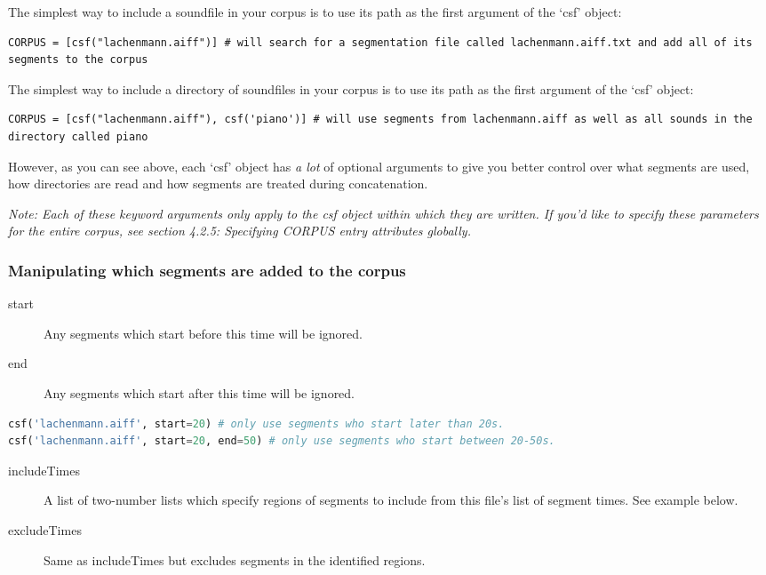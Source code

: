 \documentclass{article}
\begin{document}
\begin{spacing}{1.2}
The simplest way to include a soundfile in your corpus is to use its path as the first argument of the `csf' object:
\begin{lstlisting}
CORPUS = [csf("lachenmann.aiff")] # will search for a segmentation file called lachenmann.aiff.txt and add all of its segments to the corpus
\end{lstlisting}

The simplest way to include a directory of soundfiles in your corpus is to use its path as the first argument of the `csf' object:
\begin{lstlisting}
CORPUS = [csf("lachenmann.aiff"), csf('piano')] # will use segments from lachenmann.aiff as well as all sounds in the directory called piano
\end{lstlisting}

\noindent However, as you can see above, each `csf' object has \emph{a lot} of optional arguments to give you better control over what segments are used, how directories are read and how segments are treated during concatenation.  

\emph{Note: Each of these keyword arguments only apply to the csf object within which they are written.  If you'd like to specify these parameters for the entire corpus, see section 4.2.5: Specifying CORPUS entry attributes globally.}

\subsubsection{Manipulating which segments are added to the corpus}
\begin{description}
\item[start] Any segments which start before this time will be ignored.
\item[end] Any segments which start after this time will be ignored.
\end{description}

\begin{lstlisting}[language=python]
csf('lachenmann.aiff', start=20) # only use segments who start later than 20s.
csf('lachenmann.aiff', start=20, end=50) # only use segments who start between 20-50s.
\end{lstlisting}

\begin{description}
\item[includeTimes] A list of two-number lists which specify regions of segments to include from this file's list of segment times.  See example below.
\item[excludeTimes] Same as includeTimes but excludes segments in the identified regions.
\end{description}


\end{spacing}
\end{document}
